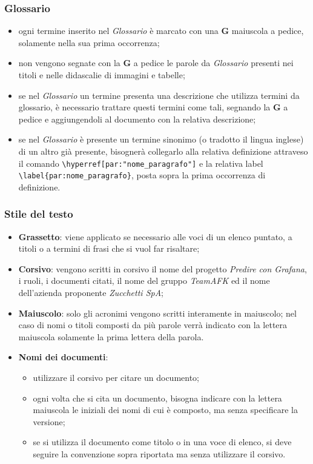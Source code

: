 \subsubsection{Glossario}
\begin{itemize}
\item ogni termine inserito nel \textit{Glossario} è marcato con una \textbf{G} maiuscola a pedice, solamente nella sua prima occorrenza;
\item non vengono segnate con la \textbf{G} a pedice le parole da \textit{Glossario} presenti nei titoli e nelle didascalie di immagini e tabelle;
\item se nel \textit{Glossario} un termine presenta una descrizione che utilizza termini da glossario, è necessario trattare questi termini come tali, segnando la \textbf{G} a pedice e aggiungendoli al documento con la relativa descrizione;
\item se nel \textit{Glossario} è presente un termine sinonimo (o tradotto il lingua inglese) di un altro già presente, bisognerà collegarlo alla relativa definizione attraveso il comando \verb|\hyperref[par:"nome_paragrafo"]| e la relativa label \verb|\label{par:nome_paragrafo}|, posta sopra la prima occorrenza di definizione.
\end{itemize}

\subsubsection{Stile del testo}
\begin{itemize}
\item \textbf{Grassetto}: viene applicato se necessario alle voci di un elenco puntato, a titoli o a termini di frasi che si vuol far risaltare;
\item \textbf{Corsivo}: vengono scritti in corsivo il nome del progetto \textit{Predire con Grafana}, i ruoli, i documenti citati, il nome del gruppo \textit{TeamAFK} ed il nome dell'azienda proponente \textit{Zucchetti SpA};
\item \textbf{Maiuscolo}: solo gli acronimi vengono scritti interamente in maiuscolo; nel caso di nomi o titoli composti da più parole verrà indicato con la lettera maiuscola solamente la prima lettera della parola.
\item \textbf{Nomi dei documenti}: 
\begin{itemize}
\item utilizzare il corsivo per citare un documento;
\item ogni volta che si cita un documento, bisogna indicare con la lettera maiuscola le iniziali dei nomi di cui è composto, ma senza specificare la versione;
\item se si utilizza il documento come titolo o in una voce di elenco, si deve seguire la convenzione sopra riportata ma senza utilizzare il corsivo. 
\end{itemize}
\end{itemize}

